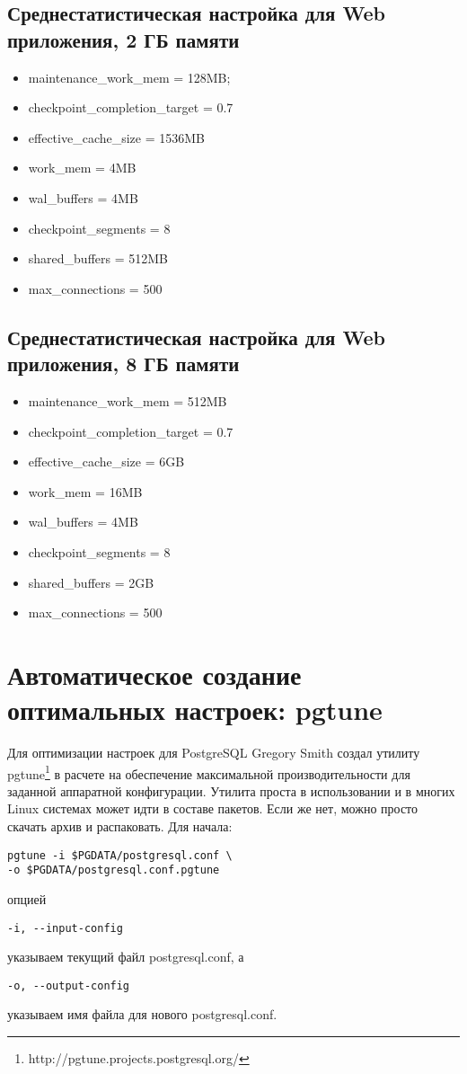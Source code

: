 \subsection{Среднестатистическая настройка для Web приложения, 2 ГБ памяти}

\begin{itemize}
\item maintenance\_work\_mem = 128MB;
\item checkpoint\_completion\_target = 0.7
\item effective\_cache\_size = 1536MB
\item work\_mem = 4MB
\item wal\_buffers = 4MB
\item checkpoint\_segments = 8
\item shared\_buffers = 512MB
\item max\_connections = 500
\end{itemize}

\subsection{Среднестатистическая настройка для Web приложения, 8 ГБ памяти}

\begin{itemize}
\item maintenance\_work\_mem = 512MB
\item checkpoint\_completion\_target = 0.7
\item effective\_cache\_size = 6GB
\item work\_mem = 16MB
\item wal\_buffers = 4MB
\item checkpoint\_segments = 8
\item shared\_buffers = 2GB
\item max\_connections = 500
\end{itemize}

\section{Автоматическое создание оптимальных настроек: pgtune}

Для оптимизации настроек для PostgreSQL Gregory Smith создал утилиту pgtune\footnote{http://pgtune.projects.postgresql.org/} 
в расчете на обеспечение максимальной производительности для заданной аппаратной конфигурации.
Утилита проста в использовании и в многих Linux системах может идти в составе пакетов. 
Если же нет, можно просто скачать архив и распаковать.
Для начала:
\begin{verbatim}
pgtune -i $PGDATA/postgresql.conf \
-o $PGDATA/postgresql.conf.pgtune
\end{verbatim}
опцией 
\begin{verbatim}-i, --input-config\end{verbatim} 
указываем текущий файл postgresql.conf, 
а 
\begin{verbatim}-o, --output-config\end{verbatim}
указываем имя файла для нового postgresql.conf.

